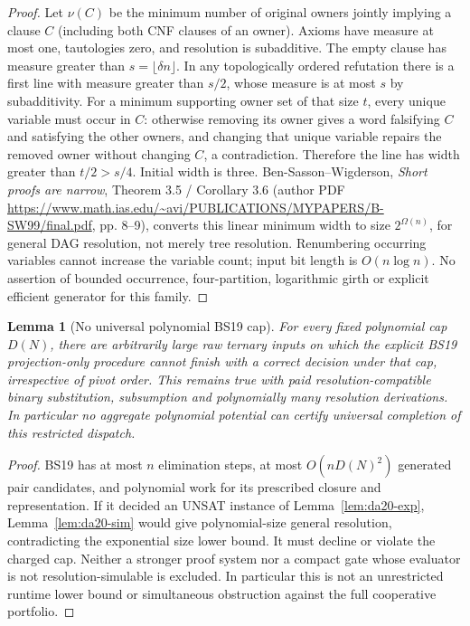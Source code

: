 \documentclass[11pt]{article}
\newtheorem{lemma}[theorem]{Lemma}
\begin{document}
\begin{proof}
Let $\nu(C)$ be the minimum number of original owners jointly implying a clause $C$ (including both CNF clauses of an owner). Axioms have measure at most one, tautologies zero, and resolution is subadditive. The empty clause has measure greater than $s=\lfloor\delta n\rfloor$. In any topologically ordered refutation there is a first line with measure greater than $s/2$, whose measure is at most $s$ by subadditivity. For a minimum supporting owner set of that size $t$, every unique variable must occur in $C$: otherwise removing its owner gives a word falsifying $C$ and satisfying the other owners, and changing that unique variable repairs the removed owner without changing $C$, a contradiction. Therefore the line has width greater than $t/2>s/4$. Initial width is three. Ben-Sasson--Wigderson, \emph{Short proofs are narrow}, Theorem 3.5 / Corollary 3.6 (author PDF \url{https://www.math.ias.edu/~avi/PUBLICATIONS/MYPAPERS/B-SW99/final.pdf}, pp. 8--9), converts this linear minimum width to size $2^{\Omega(n)}$, for general DAG resolution, not merely tree resolution. Renumbering occurring variables cannot increase the variable count; input bit length is $O(n\log n)$. No assertion of bounded occurrence, four-partition, logarithmic girth or explicit efficient generator for this family.
\end{proof}

\begin{lemma}[No universal polynomial BS19 cap]\label{lem:da20-cap}
For every fixed polynomial cap $D(N)$, there are arbitrarily large raw ternary inputs on which the explicit BS19 projection-only procedure cannot finish with a correct decision under that cap, irrespective of pivot order. This remains true with paid resolution-compatible binary substitution, subsumption and polynomially many resolution derivations. In particular no aggregate polynomial potential can certify universal completion of this restricted dispatch.
\end{lemma}
\begin{proof}
BS19 has at most $n$ elimination steps, at most $O(nD(N)^2)$ generated pair candidates, and polynomial work for its prescribed closure and representation. If it decided an UNSAT instance of Lemma~\ref{lem:da20-exp}, Lemma~\ref{lem:da20-sim} would give polynomial-size general resolution, contradicting the exponential size lower bound. It must decline or violate the charged cap. Neither a stronger proof system nor a compact gate whose evaluator is not resolution-simulable is excluded. In particular this is not an unrestricted runtime lower bound or simultaneous obstruction against the full cooperative portfolio.
\end{proof}
\end{document}
